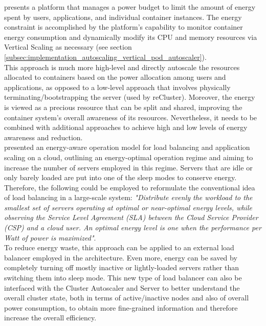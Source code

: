 \cite{power_budgeting_big_data_applications} presents a platform that manages a
power budget to limit the amount of energy spent by users, applications, and
individual container instances. The energy constraint is accomplished by the platform's
capability to monitor container energy consumption and dynamically modify its CPU
and memory resources via Vertical Scaling as necessary (see section
\ref{subsec:implementation_autoscaling_vertical_pod_autoscaler}). \\ %
This approach is much more high-level and directly autoscale the resources allocated
to containers based on the power allocation among users and applications, as
opposed to a low-level approach that involves physically terminating/bootstrapping
the server (used by reCluster). Moreover, the energy is viewed as a precious
resource that can be split and shared, improving the container system's overall awareness
of its resources. Nevertheless, it needs to be combined with additional approaches
to achieve high and low levels of energy awareness and reduction. \\ %

\cite{energy_aware_load_balancing} presented an energy-aware operation model for
load balancing and application scaling on a cloud, outlining an energy-optimal operation
regime and aiming to increase the number of servers employed in this regime.
Servers that are idle or only barely loaded are put into one of the sleep modes
to conserve energy. Therefore, the following could be employed to reformulate
the conventional idea of load balancing in a large-scale system: \textit{"Distribute
evenly the workload to the smallest set of servers operating at optimal or near-optimal
energy levels, while observing the Service Level Agreement (SLA) between the Cloud
Service Provider (CSP) and a cloud user. An optimal energy level is one when the
performance per Watt of power is maximized"}. \\ %
To reduce energy waste, this approach can be applied to an external load balancer
employed in the architecture. Even more, energy can be saved by completely turning
off mostly inactive or lightly-loaded servers rather than switching them into sleep
mode. This new type of load balancer can also be interfaced with the Cluster
Autoscaler and Server to better understand the overall cluster state, both in terms
of active/inactive nodes and also of overall power consumption, to obtain more
fine-grained information and therefore increase the overall efficiency. \\ %


